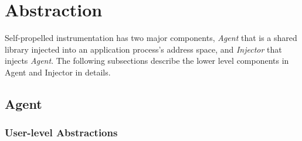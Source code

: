 \section{Abstraction}
Self-propelled instrumentation has two major components, {\em Agent} that is a
shared library injected into an application process's address space, and {\em
  Injector} that injects {\em Agent}.
The following subsections describe the lower level components in Agent and
Injector in details.

\subsection{Agent}

\subsubsection{User-level Abstractions}
